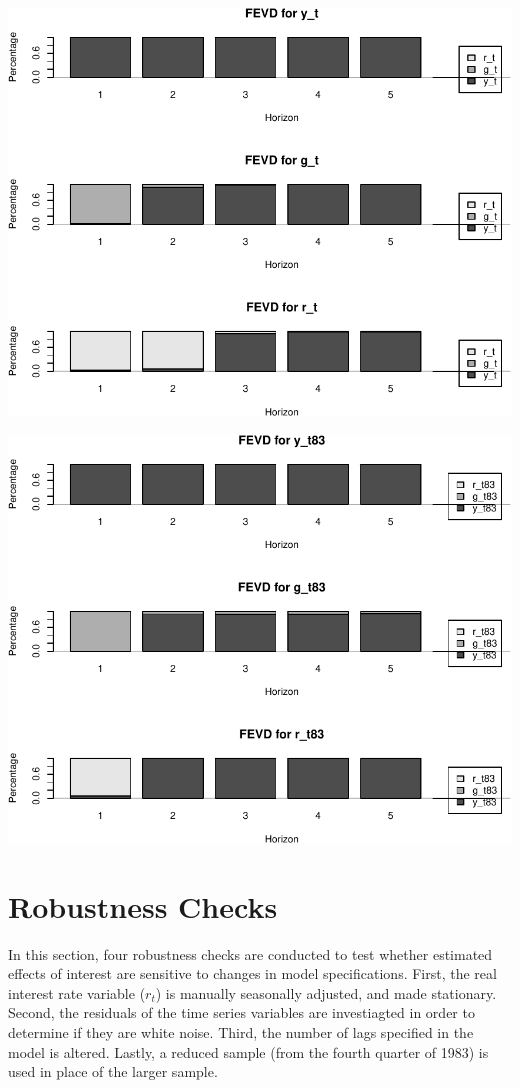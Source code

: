 \documentclass[11pt,preprint, authoryear]{elsarticle}
\numberwithin{equation}{section}
\numberwithin{figure}{section}
\numberwithin{table}{section}
\begin{document}
\includegraphics{TS_proj_files/figure-latex/unnamed-chunk-21-1.pdf}

\includegraphics{TS_proj_files/figure-latex/unnamed-chunk-22-1.pdf}

\hypertarget{robustness-checks}{%
\section{Robustness Checks}\label{robustness-checks}}

In this section, four robustness checks are conducted to test whether
estimated effects of interest are sensitive to changes in model
specifications. First, the real interest rate variable (\(r_t\)) is
manually seasonally adjusted, and made stationary. Second, the residuals
of the time series variables are investiagted in order to determine if
they are white noise. Third, the number of lags specified in the model
is altered. Lastly, a reduced sample (from the fourth quarter of 1983)
is used in place of the larger sample.
\end{document}
